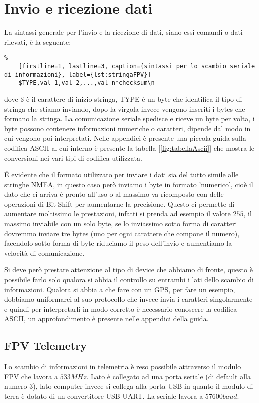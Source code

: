 
\chapter{Invio e ricezione dati}
La sintassi generale per l'invio e la ricezione di dati, siano essi comandi o dati rilevati, è la seguente:
\begin{lstlisting}%
	[firstline=1, lastline=3, caption={sintassi per lo scambio seriale di informazioni}, label={lst:stringaFPV}]
	$TYPE,val_1,val_2,...,val_n*checksum\n
\end{lstlisting}
dove \$ è il carattere di inizio stringa, TYPE è un byte che identifica il tipo di stringa che stiamo inviando, dopo la virgola invece vengono inseriti i bytes che formano la stringa. La comunicazione seriale spedisce e riceve un byte per volta, i byte possono contenere informazioni numeriche o caratteri, dipende dal modo in cui vengono poi interpretati.
Nelle appendici è presente una piccola guida sulla codifica ASCII al cui interno è presente la tabella [\ref{fig:tabellaAscii}] che mostra le conversioni nei vari tipi di codifica utilizzata.

\'E evidente che il formato utilizzato per inviare i dati sia del tutto simile alle stringhe NMEA, in questo caso però inviamo i byte in formato 'numerico', cioè il dato che ci arriva è pronto all'uso o al massimo va ricomposto con delle operazioni di Bit Shift per aumentarne la precisione. Questo ci permette di aumentare moltissimo le prestazioni, infatti si prenda ad esempio il valore $255$, il massimo inviabile con un solo byte, se lo inviassimo sotto forma di caratteri dovremmo inviare tre bytes (uno per ogni carattere che compone il numero), facendolo sotto forma di byte riduciamo il peso dell'invio e aumentiamo la velocità di comunicazione.

Si deve però prestare attenzione al tipo di device che abbiamo di fronte, questo è possibile farlo solo qualora si abbia il controllo su entrambi i lati dello scambio di informazioni. Qualora si abbia a che fare con un GPS, per fare un esempio, dobbiamo uniformarci al suo protocollo che invece invia i caratteri singolarmente e quindi per interpretarli in modo corretto è necessario conoscere la codifica ASCII, un approfondimento è presente nelle appendici della guida.

\section{FPV Telemetry}
Lo scambio di informazioni in telemetria è reso possibile attraverso il modulo FPV che lavora a $533MHz$. Lato \name è collegato ad una porta seriale (di default alla numero 3), lato computer invece si collega alla porta USB in quanto il modulo di terra è dotato di un convertitore USB-UART. La seriale lavora a $57600 baud$.

